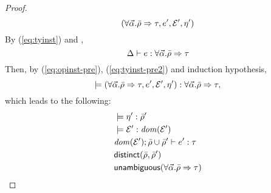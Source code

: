 \begin{proof}
\begin{equation}
    (\forall \vec{\alpha}. \bar{\rho} \Rightarrow \tau,
      e', \mathcal{E}', \eta')
  \end{equation}
  By (\ref{eq:tyinst}) and \TyInst,
  \begin{equation}
    \label{eq:tyinst-pre2}
    \Delta \vdash e:\forall \vec{\alpha}. \bar{\rho} \Rightarrow \tau
  \end{equation}
  Then, by (\ref{eq:opinst-pre}), (\ref{eq:tyinst-pre2}) and induction
  hypothesis,
  \begin{equation*}
    \models (\forall \vec{\alpha}. \bar{\rho} \Rightarrow \tau, 
        e', \mathcal{E}', \eta'):\forall \vec{\alpha}. \bar{\rho} \Rightarrow \tau,
  \end{equation*}
  which leads to the following:
  \begin{align}
    \label{eq:inst-tyrclos-pre1}
    & \models \eta':\bar{\rho}' \\
    \label{eq:inst-tyrclos-pre2}
    & \models \mathcal{E}':{\it dom }(\mathcal{E}') \\
    \label{eq:inst-tyrclos-pre3}
    & {\it dom }(\mathcal{E}'); \bar{\rho} \cup \bar{\rho}' 
    \vdash e':\tau \\
    \label{eq:inst-tyrclos-pre4}
    & {\sf distinct}(\bar{\rho}, \bar{\rho}') \\
    \label{eq:inst-tyrclos-pre5}
    & {\sf unambiguous}(\forall \vec{\alpha}. \bar{\rho} \Rightarrow \tau)
  \end{align}


\end{proof}

